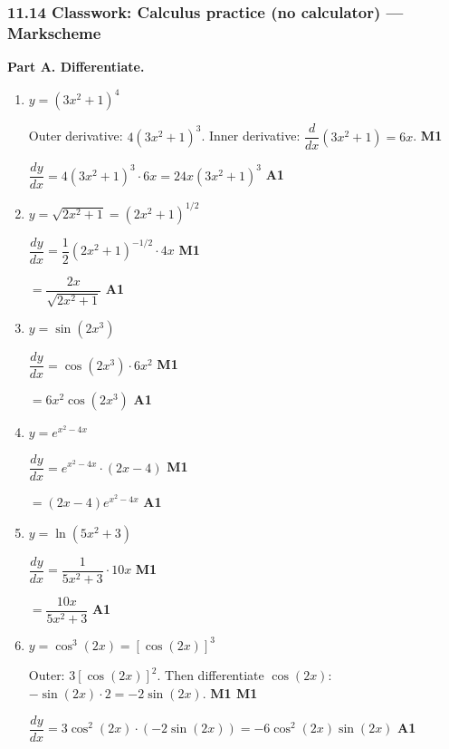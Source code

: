 \documentclass[12pt, twoside]{article}
\begin{document}
\subsubsection*{11.14 Classwork: Calculus practice (no calculator) --- Markscheme}

\textbf{Part A. Differentiate.}

\begin{enumerate}[itemsep=0.3cm]

\item[1.] $y = (3x^2 + 1)^4$

\medskip

Outer derivative: $4(3x^2 + 1)^3$. \quad Inner derivative: $\dfrac{d}{dx}(3x^2 + 1) = 6x$. \hfill \textbf{M1}

$\dfrac{dy}{dx} = 4(3x^2 + 1)^3 \cdot 6x = 24x(3x^2 + 1)^3$ \hfill \textbf{A1}

\item[2.] $y = \sqrt{2x^2 + 1} = (2x^2 + 1)^{1/2}$

\medskip

$\dfrac{dy}{dx} = \dfrac{1}{2}(2x^2 + 1)^{-1/2} \cdot 4x$ \hfill \textbf{M1}

$= \dfrac{2x}{\sqrt{2x^2 + 1}}$ \hfill \textbf{A1}

\item[3.] $y = \sin(2x^3)$

\medskip

$\dfrac{dy}{dx} = \cos(2x^3) \cdot 6x^2$ \hfill \textbf{M1}

$= 6x^2 \cos(2x^3)$ \hfill \textbf{A1}

\item[4.] $y = e^{x^2 - 4x}$

\medskip

$\dfrac{dy}{dx} = e^{x^2 - 4x} \cdot (2x - 4)$ \hfill \textbf{M1}

$= (2x - 4) e^{x^2 - 4x}$ \hfill \textbf{A1}

\item[5.] $y = \ln(5x^2 + 3)$

\medskip

$\dfrac{dy}{dx} = \dfrac{1}{5x^2 + 3} \cdot 10x$ \hfill \textbf{M1}

$= \dfrac{10x}{5x^2 + 3}$ \hfill \textbf{A1}

\item[6.] $y = \cos^3(2x) = [\cos(2x)]^3$

\medskip

Outer: $3[\cos(2x)]^2$. \quad Then differentiate $\cos(2x)$: $-\sin(2x) \cdot 2 = -2\sin(2x)$. \hfill \textbf{M1 M1}

$\dfrac{dy}{dx} = 3\cos^2(2x) \cdot (-2\sin(2x)) = -6\cos^2(2x)\sin(2x)$ \hfill \textbf{A1}

\end{enumerate}
\end{document}
